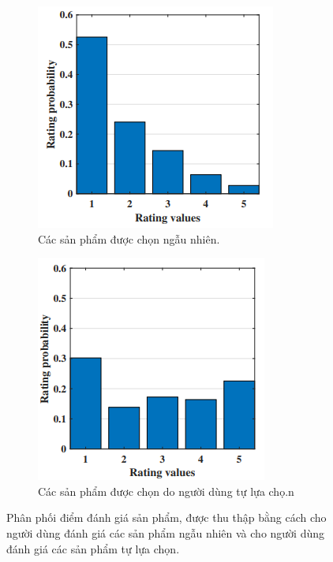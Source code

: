 \begin{figure}
    \centering
    \begin{subfigure}[b]{0.4\textwidth}
     \centering
     \includegraphics[width=\textwidth]{images/Chapter1/bias_1.png}
     \caption{Các sản phẩm được chọn ngẫu nhiên.}
     \label{fig:randomly_selected}
    \end{subfigure}
    \hfill
    \begin{subfigure}[b]{0.4\textwidth}
     \centering
     \includegraphics[width=\textwidth]{images/Chapter1/bias_2.png}
     \caption{Các sản phẩm được chọn do người dùng tự lựa chọ.n}
     \label{fig:user_selected}
    \end{subfigure}
    \caption{Phân phối điểm đánh giá sản phẩm, được thu thập bằng cách cho người dùng đánh giá các sản phẩm ngẫu nhiên và cho người dùng đánh giá các sản phẩm tự lựa chọn.}
    \label{fig:self_selection_bias}
\end{figure}

